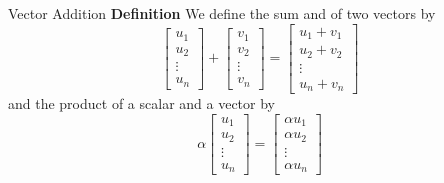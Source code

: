   \begin{frame}[fragile]{Vector Addition}
 \textbf{Definition}
    We define the sum and  of two vectors by 
     \[
      \left[\begin{array}{r}
       u_1 \\ u_2 \\ \vdots \\ u_n
      \end{array}\right]
    +
    \left[\begin{array}{r}
       v_1 \\ v_2 \\ \vdots \\ v_n
      \end{array}\right]
     = 
     \left[\begin{array}{r}
       u_1 + v_1  \\ u_2 + v_2 \\ \vdots \\ u_n + v_n
      \end{array}\right]
    \]     
    and the product of a scalar and a vector by
    \[
     \alpha \left[\begin{array}{r}
       u_1 \\ u_2 \\ \vdots \\ u_n
      \end{array}\right]
    =  
    \left[\begin{array}{r}
       \alpha u_1 \\ \alpha u_2 \\ \vdots \\ \alpha u_n
      \end{array}\right]
    \]
 
\end{frame}

